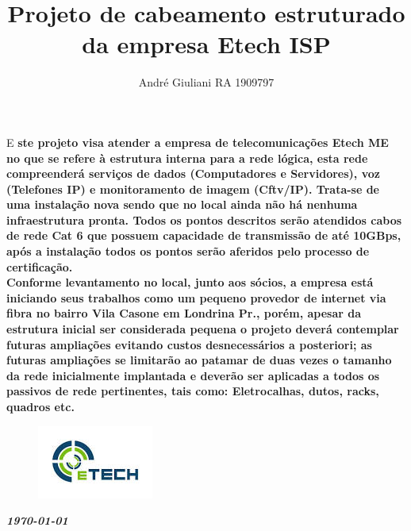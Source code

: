 \documentclass[	DIV=calc,%
							paper=a4,%
							fontsize=12pt,%
							onecolumn]{scrartcl}	 					%
\title{Projeto de cabeamento estruturado da empresa Etech ISP}					%
\author{André Giuliani RA 1909797 }  	%
\date{}																				%
\newcommand{\initial}[1]{%
     \lettrine[lines=3,lhang=0.3,nindent=0em]{
     				\color{DarkGoldenrod}
     				{\textsf{#1}}}{}}
\begin{document}
\maketitle
\thispagestyle{fancy} 	
\thispagestyle{empty}		%




\initial{E}\textbf
{	ste projeto visa atender a empresa de telecomunicações Etech ME no que se refere à estrutura interna para a rede lógica, esta rede compreenderá serviços de dados (Computadores e Servidores), voz (Telefones IP) e monitoramento de imagem (Cftv/IP). Trata-se de uma instalação nova sendo que no local ainda não há nenhuma infraestrutura pronta. Todos os pontos descritos serão atendidos cabos de rede Cat 6 que possuem capacidade de transmissão de até 10GBps, após a instalação todos os pontos serão aferidos pelo processo de certificação.}\\

\textbf
{	Conforme levantamento no local, junto aos sócios, a empresa está iniciando seus trabalhos como um pequeno provedor de internet via fibra no bairro Vila Casone em Londrina Pr., porém, apesar da estrutura inicial ser considerada pequena o projeto deverá contemplar futuras ampliações evitando custos desnecessários a posteriori; as futuras ampliações se limitarão ao patamar de duas vezes o tamanho da rede inicialmente implantada e deverão ser aplicadas a todos os passivos de rede pertinentes, tais como: Eletrocalhas, dutos, racks, quadros etc.}

\begin{figure}
	\centering
	\includegraphics{Etech}
\end{figure}

\vspace{3cm}
\centerline{\textit{\textbf{\today}}}

\clearpage
    \renewcommand*\listfigurename{Lista de figuras}
\listoffigures
\end{document}
